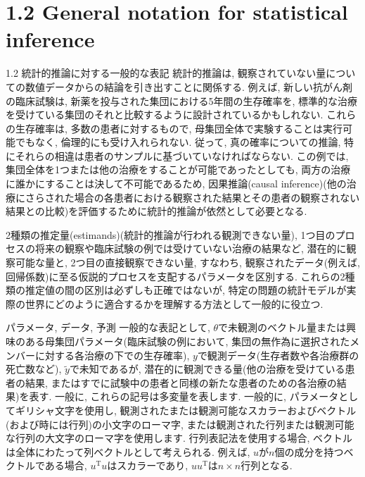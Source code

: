 \documentclass[10pt,dvipdfmx,a4]{beamer}
\begin{document}
\section{1.2 General notation for statistical inference}
\begin{frame}{1.2 統計的推論に対する一般的な表記}
統計的推論は, 観察されていない量についての数値データからの結論を引き出すことに関係する.
例えば, 新しい抗がん剤の臨床試験は, 新薬を投与された集団における5年間の生存確率を, 標準的な治療を受けている集団のそれと比較するように設計されているかもしれない.
これらの生存確率は, 多数の患者に対するもので, 母集団全体で実験することは実行可能でもなく, 倫理的にも受け入れられない.
従って, 真の確率についての推論, 特にそれらの相違は患者のサンプルに基づいていなければならない.
この例では, 集団全体を1つまたは他の治療をすることが可能であったとしても, 両方の治療に誰かにすることは決して不可能であるため, 因果推論(causal inference)(他の治療にさらされた場合の各患者における観察された結果とその患者の観察されない結果との比較)を評価するために統計的推論が依然として必要となる.
\end{frame}


\begin{frame}
2種類の推定量(estimands)(統計的推論が行われる観測できない量), 1つ目のプロセスの将来の観察や臨床試験の例では受けていない治療の結果など, 潜在的に観察可能な量と, 2つ目の直接観察できない量, すなわち, 観察されたデータ(例えば, 回帰係数)に至る仮説的プロセスを支配するパラメータを区別する.
これらの2種類の推定値の間の区別は必ずしも正確ではないが, 特定の問題の統計モデルが実際の世界にどのように適合するかを理解する方法として一般的に役立つ.
\end{frame}


\begin{frame}{パラメータ, データ, 予測}
一般的な表記として, $\theta$で未観測のベクトル量または興味のある母集団パラメータ(臨床試験の例において, 集団の無作為に選択されたメンバーに対する各治療の下での生存確率), $y$で観測データ(生存者数や各治療群の死亡数など), $\tilde{y}$で未知であるが, 潜在的に観測できる量(他の治療を受けている患者の結果, またはすでに試験中の患者と同様の新たな患者のための各治療の結果)を表す.
一般に, これらの記号は多変量を表します.
一般的に, パラメータとしてギリシャ文字を使用し, 観測されたまたは観測可能なスカラーおよびベクトル(および時には行列)の小文字のローマ字, または観測された行列または観測可能な行列の大文字のローマ字を使用します.
行列表記法を使用する場合, ベクトルは全体にわたって列ベクトルとして考えられる.
例えば, $u$が$n$個の成分を持つベクトルである場合, $u^{\mathrm{T}}u$はスカラーであり, $uu^{\mathrm{T}}$は$n\times n$行列となる.
\end{frame}
\end{document}
